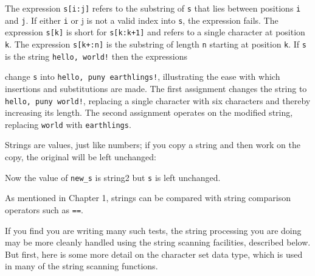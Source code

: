 \bigskip

The expression \texttt{s[i:j]} refers to the
substring of \texttt{s} that lies between positions
\texttt{i} and \texttt{j}. If either \texttt{i} or j is not a valid
index into \texttt{s}, the expression fails. The expression
\texttt{s[k]} is short for \texttt{s[k:k+1]} and refers to a single
character at position \texttt{k}. The expression
\texttt{s[k+:n]} is the substring of length \texttt{n} starting at
position \texttt{k}. If \texttt{s} is the string
\texttt{{\textquotedbl}hello, world!{\textquotedbl}} then the
expressions


\noindent
change \texttt{s} into \texttt{{\textquotedbl}hello, puny
earthlings!{\textquotedbl}}, illustrating the ease with which
insertions and substitutions are made. The first assignment changes the
string to \texttt{{\textquotedbl}hello, puny world!{\textquotedbl}},
replacing a single character with six characters and thereby increasing
its length. The second assignment operates on the modified string,
replacing \texttt{{\textquotedbl}world{\textquotedbl}} with
\texttt{{\textquotedbl}earthlings{\textquotedbl}}.

Strings are values, just like numbers; if you copy a string and then
work on the copy, the original will be left unchanged:


Now the value of \texttt{new\_s} is
{\textquotedbl}string2{\textquotedbl} but \texttt{s} is left unchanged.

As mentioned in Chapter 1, strings can be compared with string
comparison operators such as
\texttt{==}.


If you find you are writing many such tests, the string processing you
are doing may be more cleanly handled using the string scanning
facilities, described below. But first, here is some more detail on the
character set data type, which is used in many of the string scanning
functions.

